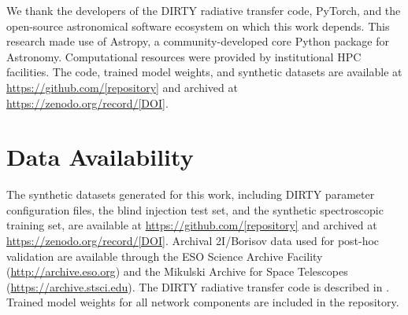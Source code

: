 \documentclass[preprint2]{aastex631}
\begin{document}
\begin{acknowledgments}
We thank the developers of the DIRTY radiative transfer code, PyTorch, and the open-source astronomical software ecosystem on which this work depends. This research made use of Astropy, a community-developed core Python package for Astronomy. Computational resources were provided by institutional HPC facilities. The code, trained model weights, and synthetic datasets are available at \url{https://github.com/[repository]} and archived at \url{https://zenodo.org/record/[DOI]}.
\end{acknowledgments}

\section*{Data Availability}
The synthetic datasets generated for this work, including DIRTY parameter configuration files, the blind injection test set, and the synthetic spectroscopic training set, are available at \url{https://github.com/[repository]} and archived at \url{https://zenodo.org/record/[DOI]}. Archival 2I/Borisov data used for post-hoc validation are available through the ESO Science Archive Facility (\url{http://archive.eso.org}) and the Mikulski Archive for Space Telescopes (\url{https://archive.stsci.edu}). The DIRTY radiative transfer code is described in \citet{gordon01}. Trained model weights for all network components are included in the repository.


\end{document}
